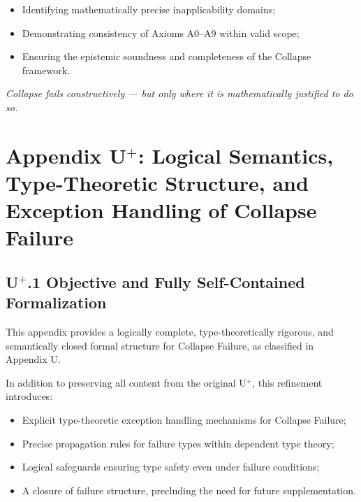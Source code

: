 \documentclass[11pt]{article}
\begin{document}
\begin{itemize}
    \item Identifying mathematically precise inapplicability domains;
    \item Demonstrating consistency of Axioms A0–A9 within valid scope;
    \item Ensuring the epistemic soundness and completeness of the Collapse framework.
\end{itemize}

\begin{center}
\textit{Collapse fails constructively — but only where it is mathematically justified to do so.}
\end{center}




\section*{Appendix U$^{+}$: Logical Semantics, Type-Theoretic Structure, and Exception Handling of Collapse Failure}

\subsection*{U$^{+}$.1 Objective and Fully Self-Contained Formalization}

This appendix provides a logically complete, type-theoretically rigorous, and semantically closed formal structure for Collapse Failure, as classified in Appendix U.

In addition to preserving all content from the original U$^{+}$, this refinement introduces:

\begin{itemize}
    \item Explicit type-theoretic exception handling mechanisms for Collapse Failure;
    \item Precise propagation rules for failure types within dependent type theory;
    \item Logical safeguards ensuring type safety even under failure conditions;
    \item A closure of failure structure, precluding the need for future supplementation.
\end{itemize}
\end{document}
